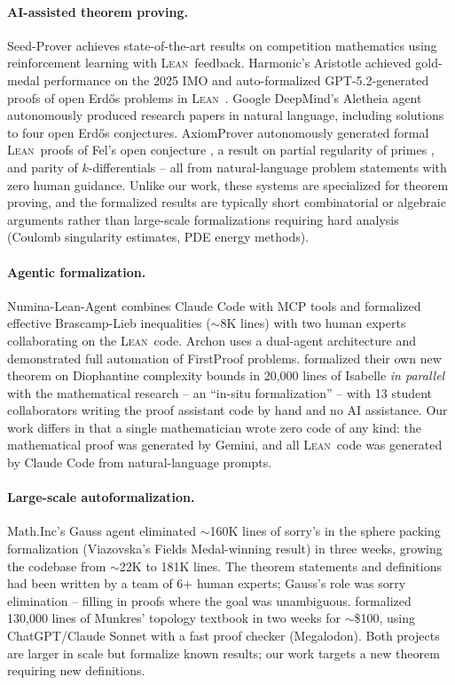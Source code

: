 \documentclass[11pt]{article}
\newcommand{\lean}{\textsc{Lean}}
\begin{document}
\paragraph{AI-assisted theorem proving.}
Seed-Prover \citep{seedprover2025} achieves state-of-the-art results on competition mathematics using reinforcement learning with \lean\ feedback. Harmonic's Aristotle \citep{aristotle2025} achieved gold-medal performance on the 2025 IMO and auto-formalized GPT-5.2-generated proofs of open Erd\H{o}s problems in \lean\ \citep{erdos728}. Google DeepMind's Aletheia agent \citep{aletheia2026,erdos_gemini2026} autonomously produced research papers in natural language, including solutions to four open Erd\H{o}s conjectures. AxiomProver autonomously generated formal \lean\ proofs of Fel's open conjecture \citep{axiom2026fel}, a result on partial regularity of primes \citep{axiom2026partial}, and parity of $k$-differentials \citep{axiom2026parity} -- all from natural-language problem statements with zero human guidance. Unlike our work, these systems are specialized for theorem proving, and the formalized results are typically short combinatorial or algebraic arguments rather than large-scale formalizations requiring hard analysis (Coulomb singularity estimates, PDE energy methods).

\paragraph{Agentic formalization.}
Numina-Lean-Agent \citep{numina2025} combines Claude Code with MCP tools and formalized effective Brascamp-Lieb inequalities ($\sim$8K lines) with two human experts collaborating on the \lean\ code. Archon \citep{archon2025} uses a dual-agent architecture and demonstrated full automation of FirstProof problems. \citet{davidbayer2025} formalized their own new theorem on Diophantine complexity bounds in 20{,}000 lines of Isabelle \emph{in parallel} with the mathematical research -- an ``in-situ formalization'' -- with 13 student collaborators writing the proof assistant code by hand and no AI assistance. Our work differs in that a single mathematician wrote zero code of any kind: the mathematical proof was generated by Gemini, and all \lean\ code was generated by Claude Code from natural-language prompts.

\paragraph{Large-scale autoformalization.}
Math.Inc's Gauss agent \citep{mathinc2026sphere} eliminated $\sim$160K lines of sorry's in the sphere packing formalization (Viazovska's Fields Medal-winning result) in three weeks, growing the codebase from $\sim$22K to 181K lines. The theorem statements and definitions had been written by a team of 6+ human experts; Gauss's role was sorry elimination -- filling in proofs where the goal was unambiguous. \citet{urban2025topology} formalized 130{,}000 lines of Munkres' topology textbook in two weeks for $\sim$\$100, using ChatGPT/Claude Sonnet with a fast proof checker (Megalodon). Both projects are larger in scale but formalize known results; our work targets a new theorem requiring new definitions.
\end{document}
